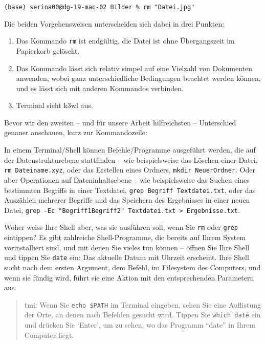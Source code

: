\documentclass[
  letterpaper,
]{book}
\providecommand{\tightlist}{%
  \setlength{\itemsep}{0pt}\setlength{\parskip}{0pt}}\usepackage{longtable,booktabs,array}
\begin{document}
\texttt{(base)\ serina00@dg-19-mac-02\ Bilder\ \%\ rm\ "Datei.jpg"}

Die beiden Vorgehensweisen unterscheiden sich dabei in drei Punkten:

\begin{enumerate}
\def\labelenumi{\arabic{enumi}.}
\tightlist
\item
  Das Kommando \texttt{rm} ist endgültig, die Datei ist ohne
  Übergangszeit im Papierkorb gelöscht.
\item
  Das Kommando lässt sich relativ simpel auf eine Vielzahl von
  Dokumenten anwenden, wobei ganz unterschiedliche Bedingungen beachtet
  werden können, und es lässt sich mit anderen Kommandos verbinden.
\item
  Terminal sieht k3wl aus.
\end{enumerate}

Bevor wir den zweiten -- und für unsere Arbeit hilfreichsten --
Unterschied genauer anschauen, kurz zur Kommandozeile:

In einem Terminal/Shell können Befehle/Programme ausgeführt werden, die
auf der Datenstrukturebene stattfinden -- wie beispielsweise das Löschen
einer Datei, \texttt{rm\ Dateiname.xyz}, oder das Erstellen eines
Ordners, \texttt{mkdir\ NeuerOrdner}. Oder aber Operationen auf
Dateninhaltsebene -- wie beispielsweise das Suchen eines bestimmten
Begriffs in einer Textdatei, \texttt{grep\ Begriff\ Textdatei.txt}, oder
das Auszählen mehrerer Begriffe und das Speichern des Ergebnisses in
einer neuen Datei,
\texttt{grep\ -Ec\ "Begriff1\textbar{}Begriff2"\ Textdatei.txt\ \textgreater{}\ Ergebnisse.txt}.

Woher weiss Ihre Shell aber, was sie ausführen soll, wenn Sie
\texttt{rm} oder \texttt{grep} eintippen? Es gibt zahlreiche
Shell-Programme, die bereits auf Ihrem System vorinstalliert sind, und
mit denen Sie vieles tun können -- öffnen Sie Ihre Shell und tippen Sie
\texttt{date} ein: Das aktuelle Datum mit Uhrzeit erscheint. Ihre Shell
sucht nach dem ersten Argument, dem Befehl, im Filesystem des Computers,
und wenn sie fündig wird, führt sie eine Aktion mit den entsprechenden
Parametern aus.

\begin{quote}
tmi: Wenn Sie \texttt{echo\ \$PATH} im Terminal eingeben, sehen Sie eine
Auflistung der Orte, an denen nach Befehlen gesucht wird. Tippen Sie
\texttt{which\ date} ein und drücken Sie `Enter', um zu sehen, wo das
Programm ``date'' in Ihrem Computer liegt.
\end{quote}
\end{document}
